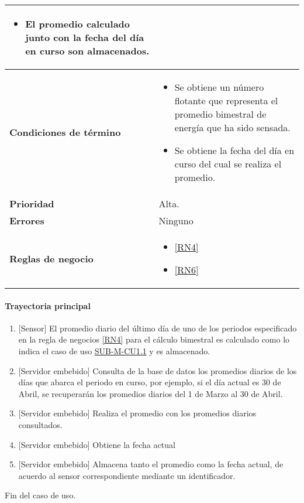 \begin{longtable}{|J{5cm}|J{10.3cm}|}
\begin{itemize}
			\item El promedio calculado junto con la fecha del día en curso son almacenados.
		\end{itemize}\\ \hline
	\textbf{Condiciones de término} & 
		\begin{itemize}
			\item Se obtiene un número flotante que representa el promedio bimestral de energía que ha sido sensada.
			\item Se obtiene la fecha del día en curso del cual se realiza el promedio.
		\end{itemize} \\ \hline 
	\textbf{Prioridad} & 
		Alta. \\ \hline
	\textbf{Errores} & 
		Ninguno \\ \hline
	\textbf{Reglas de negocio} & 
		\begin{itemize}
			\item \ref{RN4}
			\item \ref{RN6}
		\end{itemize} \\ \hline

\end{longtable}

\paragraph{Trayectoria principal}
	\begin{enumerate}
		\item {[Sensor]} El promedio diario del último día de uno de los periodos especificado en la regla de negocios \ref{RN4} para el cálculo bimestral es calculado como lo indica el caso de uso \hyperref[SUB-M-CU1.1]{SUB-M-CU1.1} y es almacenado.
		\item  {[Servidor embebido]} Consulta de la base de datos los promedios diarios de los días que abarca el periodo en curso, por ejemplo, si el día actual es 30 de Abril, se recuperarán los promedios diarios del 1 de Marzo al 30 de Abril.
		\item {[Servidor embebido]} Realiza el promedio con los promedios diarios consultados.
		\item {[Servidor embebido]} Obtiene la fecha actual
		\item {[Servidor embebido]} Almacena tanto el promedio como la fecha actual, de acuerdo al sensor correspondiente mediante un identificador.
	\end{enumerate}
	Fin del caso de uso.
